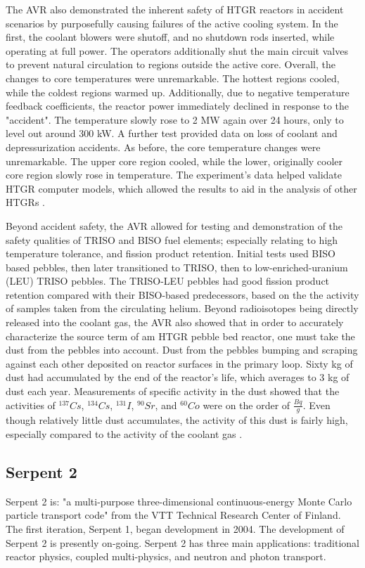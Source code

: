 The AVR also demonstrated the inherent safety of HTGR reactors in accident scenarios by purposefully causing failures of the active cooling system.  In the first, the coolant blowers were shutoff, and no shutdown rods inserted, while operating at full power.  The operators additionally shut the main circuit valves to prevent natural circulation to regions outside the active core.  Overall, the changes to core temperatures were unremarkable.  The hottest regions cooled, while the coldest regions warmed up.  Additionally, due to negative temperature feedback coefficients, the reactor power immediately declined in response to the "accident".  The temperature slowly rose to 2 MW again over 24 hours, only to level out around 300 kW.  A further test provided data on loss of coolant and depressurization accidents.  As before, the core temperature changes were unremarkable.  The upper core region cooled, while the lower, originally cooler core region slowly rose in temperature.  The experiment's data helped validate HTGR computer models, which allowed the results to aid in the analysis of other HTGRs \cite{noauthor_results_1990}.

Beyond accident safety, the AVR allowed for testing and demonstration of the safety qualities of TRISO and BISO fuel elements; especially relating to high temperature tolerance, and fission product retention.  Initial tests used BISO based pebbles, then later transitioned to TRISO, then to low-enriched-uranium (LEU) TRISO pebbles.  The TRISO-LEU pebbles had good fission product retention compared with their BISO-based predecessors, based on the the activity of samples taken from the circulating helium.  Beyond radioisotopes being directly released into the coolant gas, the AVR also showed that in order to accurately characterize the source term of am HTGR pebble bed reactor, one must take the dust from the pebbles into account.  Dust from the pebbles bumping and scraping against each other deposited on reactor surfaces in the primary loop.  Sixty kg of dust had accumulated by the end of the reactor's life, which averages to 3 kg of dust each year.  Measurements of specific activity in the dust showed that the activities of $^{137}Cs$, $^{134}Cs$, $^{131}I$, $^{90}Sr$, and $^{60}Co$ were on the order of $\frac{Bq}{g}$.  Even though relatively little dust accumulates, the activity of this dust is fairly high, especially compared to the activity of the coolant gas \cite{noauthor_results_1990}.





\subsection{Serpent 2}
Serpent 2 is: "a multi-purpose three-dimensional continuous-energy Monte Carlo particle transport code" \cite{noauthor_serpent_nodate} from the VTT Technical Research Center of Finland.  The first iteration, Serpent 1, began development in 2004.  The development of Serpent 2 is presently on-going.  Serpent 2 has three main applications: traditional reactor physics, coupled multi-physics, and neutron and photon transport.  